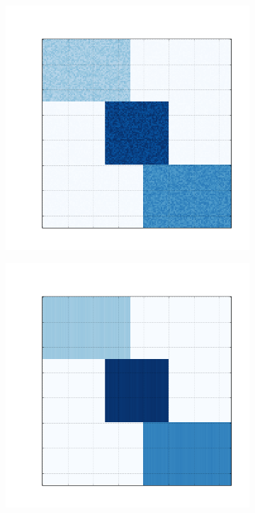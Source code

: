 \documentclass[10pt]{beamer}
\begin{document}
\begin{frame}
  \begin{figure}[H]
  \centering
      \begin{subfigure}[b]{0.13\textwidth}
          \includegraphics[width=\textwidth]{img/d-bic-structure.png}
      \end{subfigure}
      \begin{subfigure}[b]{0.13\textwidth}
          \includegraphics[width=\textwidth]{img/d-reconstruction-kmeans.png}

\end{subfigure}
\end{figure}
\end{frame}
\end{document}
